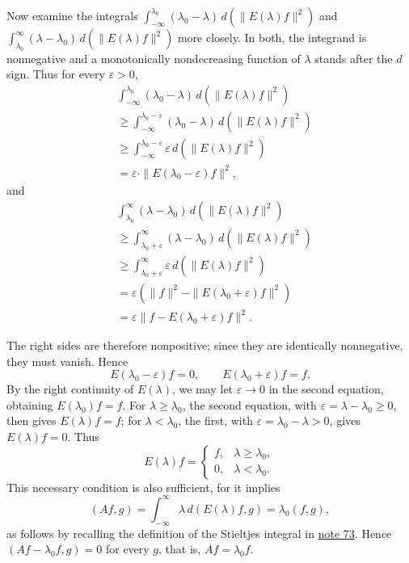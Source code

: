 \documentclass[fontsize=13pt,twoside,openany,headings=normal,parskip=false,bookmarkpackage=false,DIV=calc]{scrbook}
\begin{document}
Now examine the integrals $\int_{-\infty}^{\lambda_0}(\lambda_0-\lambda)\,d(\|E(\lambda)f\|^2)$ and $\int_{\lambda_0}^{\infty}(\lambda-\lambda_0)\,d(\|E(\lambda)f\|^2)$ more closely. In both, the integrand is nonnegative and a monotonically nondecreasing function of $\lambda$ stands after the $d$ sign. Thus for every $\varepsilon>0$,
\begin{align*}
&\int_{-\infty}^{\lambda_0}(\lambda_0-\lambda)\,d(\|E(\lambda)f\|^2)\\
&\geq\int_{-\infty}^{\lambda_0-\varepsilon}(\lambda_0-\lambda)\,d(\|E(\lambda)f\|^2)\\
&\geq\int_{-\infty}^{\lambda_0-\varepsilon}\varepsilon\,d(\|E(\lambda)f\|^2)\\
&=\varepsilon\cdot\|E(\lambda_0-\varepsilon)f\|^2,
\end{align*}
and
\begin{align*}
&\int_{\lambda_0}^{\infty}(\lambda-\lambda_0)\,d(\|E(\lambda)f\|^2)\\
&\geq\int_{\lambda_0+\varepsilon}^{\infty}(\lambda-\lambda_0)\,d(\|E(\lambda)f\|^2)\\
&\geq\int_{\lambda_0+\varepsilon}^{\infty}\varepsilon\,d(\|E(\lambda)f\|^2)\\
&=\varepsilon(\|f\|^2-\|E(\lambda_0+\varepsilon)f\|^2)\\
&=\varepsilon\|f-E(\lambda_0+\varepsilon)f\|^2.
\end{align*}

\hypertarget{origpage-64}{}%
The right sides are therefore nonpositive; since they are identically nonnegative, they must vanish. Hence
\[
E(\lambda_0-\varepsilon)f=0,\qquad E(\lambda_0+\varepsilon)f=f.
\]
By the right continuity of $E(\lambda)$, we may let $\varepsilon\to0$ in the second equation, obtaining $E(\lambda_0)f=f$. For $\lambda\geq\lambda_0$, the second equation, with $\varepsilon=\lambda-\lambda_0\geq0$, then gives $E(\lambda)f=f$; for $\lambda<\lambda_0$, the first, with $\varepsilon=\lambda_0-\lambda>0$, gives $E(\lambda)f=0$. Thus
\[
E(\lambda)f=\begin{cases}f,&\lambda\geq\lambda_0,\\0,&\lambda<\lambda_0.\end{cases}
\]
This necessary condition is also sufficient, for it implies
\[
(Af,g)=\int_{-\infty}^{\infty}\lambda\,d(E(\lambda)f,g)=\lambda_0(f,g),
\]
as follows by recalling the definition of the Stieltjes integral in \hyperlink{note-73}{note 73}. Hence $(Af-\lambda_0f,g)=0$ for every $g$, that is, $Af=\lambda_0f$.
\end{document}
